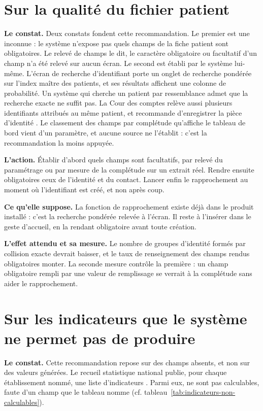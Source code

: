 \section{Sur la qualité du fichier patient}

\textbf{Le constat.} Deux constats fondent cette recommandation. Le premier est une inconnue : le
système n'expose pas quels champs de la fiche patient sont obligatoires. Le relevé de champs le dit,
le caractère obligatoire ou facultatif d'un champ n'a été relevé sur aucun écran. Le second est
établi par le système lui-même. L'écran de recherche d'identifiant porte un onglet de recherche
pondérée sur l'index maître des patients, et ses résultats affichent une colonne
de probabilité. Un système qui cherche un patient par ressemblance admet que la
recherche exacte ne suffit pas. La Cour des comptes relève aussi plusieurs identifiants attribués au
même patient, et recommande d'enregistrer la pièce d'identité \cite{s20}. Le classement des champs
par complétude qu'affiche le tableau de bord vient d'un paramètre,
et aucune source ne l'établit : c'est la recommandation la moins appuyée.

\textbf{L'action.} Établir d'abord quels champs sont facultatifs, par relevé du paramétrage ou par
mesure de la complétude sur un extrait réel. Rendre ensuite obligatoires ceux de l'identité et du
contact. Lancer enfin le rapprochement au moment où l'identifiant est créé, et non après coup.

\textbf{Ce qu'elle suppose.} La fonction de rapprochement existe déjà dans le produit installé :
c'est la recherche pondérée relevée à l'écran. Il reste à l'insérer dans le geste d'accueil, en la
rendant obligatoire avant toute création.

\textbf{L'effet attendu et sa mesure.} Le nombre de groupes d'identité formés par collision exacte
devrait baisser, et le taux de renseignement des champs rendus obligatoires monter. La seconde
mesure contrôle la première : un champ obligatoire rempli par une valeur de remplissage se verrait à
la complétude sans aider le rapprochement.

\section{Sur les indicateurs que le système ne permet pas de produire}

\textbf{Le constat.} Cette recommandation repose sur des champs absents, et non sur des valeurs
générées. Le recueil statistique national publie, pour chaque établissement nommé, une liste
d'indicateurs \cite{s30}. Parmi eux,  ne sont pas calculables, faute d'un champ que le tableau
nomme (cf. tableau~\ref{tab:indicateurs-non-calculables}).

